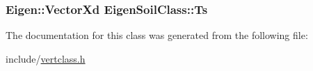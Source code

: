\subsubsection[{\texorpdfstring{Ts}{Ts}}]{\setlength{\rightskip}{0pt plus 5cm}Eigen\+::\+Vector\+Xd Eigen\+Soil\+Class\+::\+Ts}\hypertarget{class_eigen_soil_class_a42c7aa92167c6dcb931290bdfc17e51e}{}\label{class_eigen_soil_class_a42c7aa92167c6dcb931290bdfc17e51e}


The documentation for this class was generated from the following file\+:\begin{DoxyCompactItemize}
\item 
include/\hyperlink{vertclass_8h}{vertclass.\+h}\end{DoxyCompactItemize}
